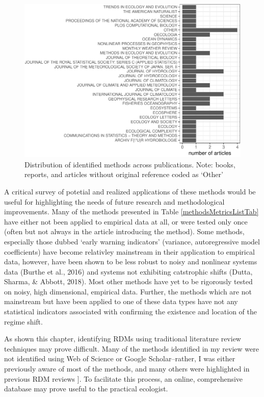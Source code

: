 \documentclass[12pt,twoside,openany]{reedthesis}
\begin{document}
\begin{figure}
\centering
\includegraphics{_myDissertation_files/figure-latex/jrnlDistFig-1.pdf}
\caption{\label{fig:jrnlDistFig}Distribution of identified methods across publications. Note: books, reports, and articles without original reference coded as `Other'}
\end{figure}
A critical survey of potetial and realized applications of these methods would be useful for highlighting the needs of future research and methodological improvements. Many of the methods presented in Table \ref{methodsMetricsListTab} have either not been applied to empirical data at all, or were tested only once (often but not always in the article introducing the method). Some methods, especially those dubbed `early warning indicators' (variance, autoregressive model coefficients) have become relativley mainstream in their application to empirical data, however, have been shown to be less robust to noisy and nonlinear systems data (Burthe et al., 2016) and systems not exhibiting catstrophic shifts (Dutta, Sharma, \& Abbott, 2018). Most other methods have yet to be rigorously tested on noisy, high dimensional, empirical data. Further, the methods which are not mainstream but have been applied to one of these data types have not any statistical indicators associated with confirming the existence and location of the regime shift.

As shown this chapter, identifying RDMs using traditional literature review techniques may prove difficult. Many of the methods identified in my review were not identified using Web of Science or Google Scholar--rather, I was either previously aware of most of the methods, and many others were highlighted in previous RDM reviews {]}. To facilitate this process, an online, comprehensive database may prove useful to the practical ecologist.
\end{document}
